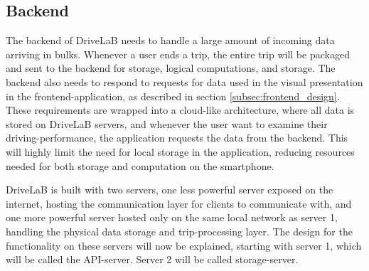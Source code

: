 \subsection{Backend}\label{subsec:backend_design}
The backend of DriveLaB needs to handle a large amount of incoming data arriving in bulks. Whenever a user ends a trip, the entire trip will be packaged and sent to the backend for storage, logical computations, and storage. The backend also needs to respond to requests for data used in the visual presentation in the frontend-application, as described in section \ref{subsec:frontend_design}. These requirements are wrapped into a cloud-like architecture, where all data is stored on DriveLaB servers, and whenever the user want to examine their driving-performance, the application requests the data from the backend. This will highly limit the need for local storage in the application, reducing resources needed for both storage and computation on the smartphone. 

DriveLaB is built with two servers, one less powerful server exposed on the internet, hosting the communication layer for clients to communicate with, and one more powerful server hosted only on the same local network as server 1, handling the physical data storage and trip-processing  layer. The design for the functionality on these servers will now be explained, starting with server 1, which will be called the API-server. Server 2 will be called storage-server.
